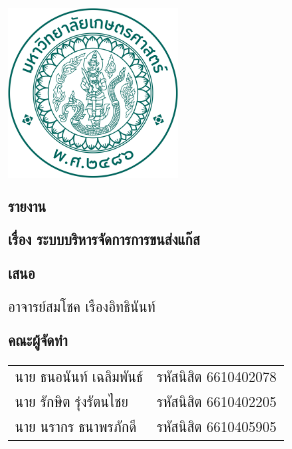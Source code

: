 \documentclass[a4paper,12pt]{memoir}
\newenvironment{thailang}
{\thaifont}
{}
\begin{document}
\begin{titlingpage}
    \centering
    \includegraphics[width=4.5cm]{./Figures/logo_ku_th.png}
    
    \vspace{0.5cm}
    
    {\Large \bfseries \begin{thailang}รายงาน\end{thailang}}
    
    \vspace{0.2cm}
    
    {\Large \bfseries \begin{thailang}เรื่อง ระบบบริหารจัดการการขนส่งแก๊ส\end{thailang}}
    
    \vspace{1.5cm}
    
    \textbf{\begin{thailang}เสนอ\end{thailang}}
    
    \vspace{0.2cm}
    
    {\begin{thailang}อาจารย์สมโชค เรืองอิทธินันท์\end{thailang}}
    
    \vspace{1.5cm}
    
    {\bfseries \begin{thailang}คณะผู้จัดทำ\end{thailang}}
    
    \vspace{0.5cm}
    
    \begin{tabular}{ll}
        \begin{thailang}นาย ธนอนันท์ เฉลิมพันธ์\end{thailang} & \begin{thailang}รหัสนิสิต 6610402078\end{thailang} \\
        \begin{thailang}นาย รักษิต รุ่งรัตนไชย\end{thailang} & \begin{thailang}รหัสนิสิต 6610402205\end{thailang} \\
        \begin{thailang}นาย นรากร ธนาพรภักดี\end{thailang} & \begin{thailang}รหัสนิสิต 6610405905\end{thailang} \\
    \end{tabular}


\end{titlingpage}
\end{document}
